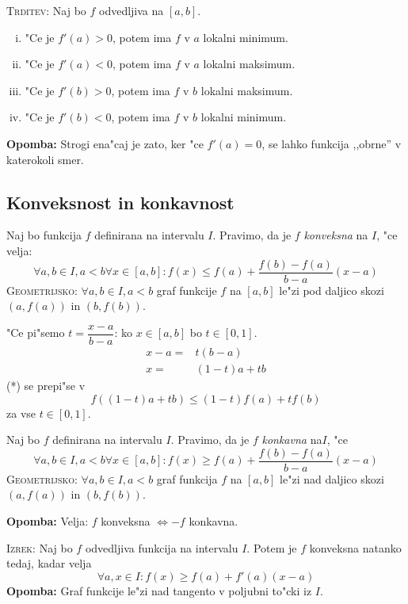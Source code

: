 \textsc{Trditev:} Naj bo $f$ odvedljiva na $[a, b]$.
\begin{enumerate}[(i)]
	\item "Ce je $f'(a) > 0$, potem ima $f$ v $a$ lokalni minimum.
	\item "Ce je $f'(a) < 0$, potem ima $f$ v $a$ lokalni maksimum.
	\item "Ce je $f'(b) > 0$, potem ima $f$ v $b$ lokalni maksimum.
	\item "Ce je $f'(b) < 0$, potem ima $f$ v $b$ lokalni minimum.
\end{enumerate}
\textbf{Opomba:} Strogi ena"caj je zato, ker "ce $f'(a) = 0$, se lahko funkcija ,,obrne'' v katerokoli smer.
%
\subsection{Konveksnost in konkavnost}
 Naj bo funkcija $f$ definirana na intervalu $I$. Pravimo, da je $f$ \emph{konveksna} na $I$, "ce velja:
\begin{equation*}
\forall a, b \in I, a < b \forall x \in [a, b]: f(x) \leq f(a) + \dfrac{f(b) - f(a)}{b - a} (x - a) \tag{*}
\end{equation*}
\textsc{Geometrijsko:} $\forall a, b \in I, a < b$ graf funkcije $f$ na $[a, b]$ le"zi pod daljico skozi $(a, f(a))$ in $(b, f(b))$.

"Ce pi"semo $t = \dfrac{x - a}{b - a}$: ko $x \in [a, b]$ bo $t\in [0, 1]$.
\begin{align*}
x - a =& t (b - a) \\
x =& (1 - t) a + tb
\end{align*}
(*) se prepi"se v
\begin{equation*}
f((1 - t)a + tb) \leq (1-t) f(a) + t f(b)
\end{equation*}
za vse $t \in [0, 1]$.

 Naj bo $f$ definirana na intervalu $I$. Pravimo, da je $f$ \emph{konkavna} na$I$, "ce
\begin{equation*}
\forall a, b \in I, a < b \forall x \in [a, b]: f(x) \geq f(a) + \dfrac{f(b) - f(a)}{b-a}(x-a)
\end{equation*}
\textsc{Geometrijsko:} $\forall a, b \in I, a < b$ graf funkcija $f$ na $[a, b]$ le"zi nad daljico skozi $(a, f(a))$ in $(b, f(b))$.

\textbf{Opomba:} Velja: $f$ konveksna $\iff -f$ konkavna.

\textsc{Izrek:} Naj bo $f$ odvedljiva funkcija na intervalu $I$. Potem je $f$ konveksna natanko tedaj, kadar velja
\begin{equation*}
\forall a, x \in I : f(x) \geq f(a) + f'(a) (x-a) \tag{*}
\end{equation*}
\textbf{Opomba:} Graf funkcije le"zi nad tangento v poljubni to"cki iz $I$.

